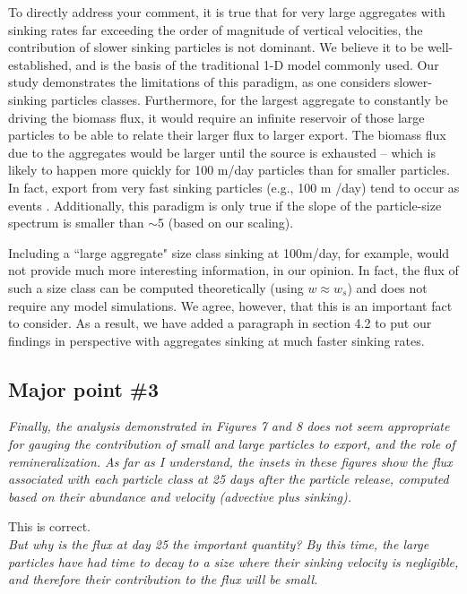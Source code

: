 \documentclass[12pt,letter]{article}
\begin{document}
To directly address your comment, it is true that for very large aggregates with sinking rates far exceeding the order of magnitude of vertical velocities, the contribution of slower sinking particles is not dominant. We believe it to be well-established, and is the basis of the traditional 1-D model commonly used. Our study demonstrates the limitations of this paradigm, as one considers slower-sinking particles classes. Furthermore, for the largest aggregate to constantly be driving the biomass flux, it would require an infinite reservoir of those large particles to be able to relate their larger flux to larger export. The biomass flux due to the aggregates would be larger until the source is exhausted -- which is likely to happen more quickly for 100 m/day particles than for smaller particles. In fact, export from very fast sinking particles (e.g., 100 m /day) tend to occur as events \citep{Kiko_2017}.
Additionally, this paradigm is only true if the slope of the particle-size spectrum is smaller than $\sim$5 (based on our scaling).

Including a ``large aggregate" size class sinking at 100m/day, for example, would not provide much more interesting information, in our opinion. In fact, the flux of such a size class can be computed theoretically (using $w \approx w_s$) and does not require any model simulations. We agree, however, that this is an important fact to consider. As a result, we have added a paragraph in section 4.2 to put our findings in perspective with aggregates sinking at much faster sinking rates.
	
\subsection*{Major point \#3}
 \textit{Finally, the analysis demonstrated in Figures 7 and 8 does not seem appropriate for gauging the contribution of small and large particles to export, and the role of remineralization. As far as I understand, the insets in these figures show the flux associated with each particle class at 25 days after the particle release, computed based on their abundance and velocity (advective plus sinking).\\}
 
This is correct.\\

 \textit{But why is the flux at day 25 the important quantity? By this time, the large particles have had time to decay to a size where their sinking velocity is negligible, and therefore their contribution to the flux will be small.}
 
\end{document}
